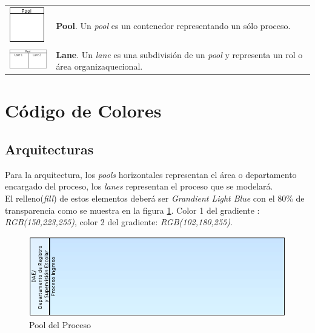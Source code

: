 	\begin{tabular}{| m{}  m{} | }%
		\rowcolor[gray]{0.97}%
		\centering\noindent\includegraphics[width=45pt]{introduccion/imagenes/procesos/bpmn/Pool.png} & {\bf Pool}. Un {\it pool} es un contenedor representando un sólo proceso. \\%
		\centering\noindent\includegraphics[width=70pt]{introduccion/imagenes/procesos/bpmn/Lane.png} & {\bf Lane}. Un {\it lane} es una subdivisión de un {\it pool} y representa un rol o área organizaquecional.
	\end{tabular}%



\section{Código de Colores}
\label{section:CodigoColores}

\subsection{Arquitecturas}

Para la arquitectura, los \textit{pools} horizontales representan el área o departamento encargado del proceso, los \textit{lanes} representan el proceso que se modelará.\\
El relleno(\textit{fill}) de estos elementos deberá ser \textit{Grandient Light Blue} con el 80\% de transparencia como se muestra en la figura \ref{fig:poolProceso}. Color 1 del gradiente : \textit{RGB(150,223,255)}, color 2  del gradiente: \textit{RGB(102,180,255)}.

\begin{figure}[hbtp!]
	\begin{center}
		\includegraphics[width=.3\textwidth]{introduccion/imagenes/procesos/PoolProceso}
		\caption{Pool del Proceso}
		\label{fig:poolProceso}
	\end{center}
\end{figure}

